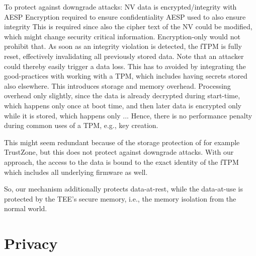 
To protect against downgrade attacks:
NV data is encrypted/integrity with AESP
Encryption required to ensure confidentiality
AESP used to also ensure integrity
This is required since also the cipher text of the NV could be modified, which might change security critical information.
Encryption-only would not prohibit that.
As soon as an integrity violation is detected, the \ac{fTPM} is fully reset, effectively invalidating all previously stored data.
Note that an attacker could thereby easily trigger a data loss.
This has to avoided by integrating the good-practices with working with a \ac{TPM}, which includes having secrets stored also elsewhere. %
This introduces storage and memory overhead.
Processing overhead only slightly, since the data is already decrypted during start-time, which happens only once at boot time, and then later data is encrypted only while it is stored, which happens only ... %
Hence, there is no performance penalty during common uses of a \ac{TPM}, e.g., key creation.

This might seem redundant because of the storage protection of for example TrustZone, but this does not protect against downgrade attacks. With our approach, the access to the data is bound to the exact identity of the fTPM which includes all underlying firmware as well.

So, our mechanism additionally protects data-at-rest, while the data-at-use is protected by the TEE's secure memory, i.e., the memory isolation from the normal world.



\section{Privacy}
\label{sec:privacy}



